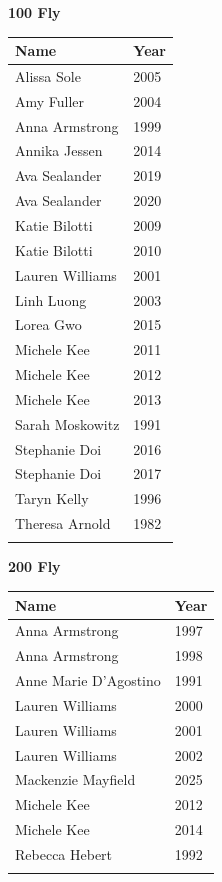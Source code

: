 \begin{minipage}[t]{0.48\textwidth}
\centering
\textbf{\textcolor{teamprimary}{100 Fly}}\par
\vspace{0.5em}
\centering
\small
\renewcommand{\arraystretch}{1.0}
\setlength{\tabcolsep}{4pt}
\begin{tabular}{@{}p{3.0cm}p{1.0cm}@{}}
\toprule
\textbf{Name} & \textbf{Year} \\
\midrule
Alissa Sole & 2005 \\
Amy Fuller & 2004 \\
Anna Armstrong & 1999 \\
Annika Jessen & 2014 \\
Ava Sealander & 2019 \\
Ava Sealander & 2020 \\
Katie Bilotti & 2009 \\
Katie Bilotti & 2010 \\
Lauren Williams & 2001 \\
Linh Luong & 2003 \\
Lorea Gwo & 2015 \\
Michele Kee & 2011 \\
Michele Kee & 2012 \\
Michele Kee & 2013 \\
Sarah Moskowitz & 1991 \\
Stephanie Doi & 2016 \\
Stephanie Doi & 2017 \\
Taryn Kelly & 1996 \\
Theresa Arnold & 1982 \\
\bottomrule
\vspace{0.5em}
\end{tabular}
\end{minipage}
\vspace{1.2em}
\noindent\begin{minipage}[t]{0.48\textwidth}
\centering
\textbf{\textcolor{teamprimary}{200 Fly}}\par
\vspace{0.5em}
\centering
\small
\renewcommand{\arraystretch}{1.0}
\setlength{\tabcolsep}{4pt}
\begin{tabular}{@{}p{3.0cm}p{1.0cm}@{}}
\toprule
\textbf{Name} & \textbf{Year} \\
\midrule
Anna Armstrong & 1997 \\
Anna Armstrong & 1998 \\
Anne Marie D'Agostino & 1991 \\
Lauren Williams & 2000 \\
Lauren Williams & 2001 \\
Lauren Williams & 2002 \\
Mackenzie Mayfield & 2025 \\
Michele Kee & 2012 \\
Michele Kee & 2014 \\
Rebecca Hebert & 1992 \\
\bottomrule
\vspace{0.5em}
\end{tabular}
\end{minipage}
